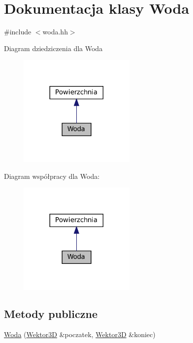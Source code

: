 \hypertarget{class_woda}{}\section{Dokumentacja klasy Woda}
\label{class_woda}


{\ttfamily \#include $<$woda.\+hh$>$}



Diagram dziedziczenia dla Woda\nopagebreak
\begin{figure}[H]
\begin{center}
\leavevmode
\includegraphics[width=161pt]{class_woda__inherit__graph}
\end{center}
\end{figure}


Diagram współpracy dla Woda\+:\nopagebreak
\begin{figure}[H]
\begin{center}
\leavevmode
\includegraphics[width=161pt]{class_woda__coll__graph}
\end{center}
\end{figure}
\subsection*{Metody publiczne}
\begin{DoxyCompactItemize}
\item 
\mbox{\hyperlink{class_woda_aff6c2ff6b5d664add678cee2820c48d5}{Woda}} (\mbox{\hyperlink{class_wektor3_d}{Wektor3D}} \&poczatek, \mbox{\hyperlink{class_wektor3_d}{Wektor3D}} \&koniec)
\end{DoxyCompactItemize}
